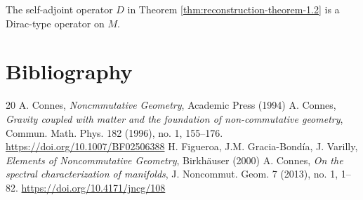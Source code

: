 \begin{corollary}\label{cor:reconstruction-theorem-1.2.a}
    The self-adjoint operator $D$ in Theorem \ref{thm:reconstruction-theorem-1.2} is a Dirac-type operator on $M$.
\end{corollary}


\section{Bibliography}

\begin{thebibliography}{20}
     A. Connes, \emph{Noncmmutative Geometry}, Academic Press (1994)
     A. Connes, \emph{Gravity coupled with matter and the foundation of non-commutative geometry}, Commun. Math. Phys. 182 (1996), no. 1, 155–176. \url{https://doi.org/10.1007/BF02506388}
     H. Figueroa, J.M. Gracia-Bond\'ia, J. Varilly, \emph{Elements of Noncommutative Geometry}, Birkh\"auser (2000) 
     A. Connes, \emph{On the spectral characterization of manifolds}, J. Noncommut. Geom. 7 (2013), no. 1, 1–82. \url{https://doi.org/10.4171/jncg/108} 
\end{thebibliography}




